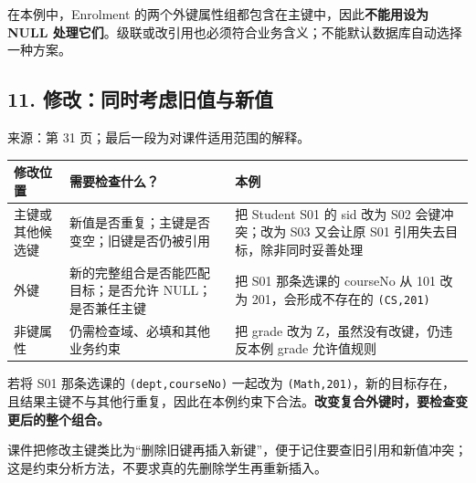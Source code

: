 在本例中，Enrolment 的两个外键属性组都包含在主键中，因此\textbf{不能用设为 NULL 处理它们}。级联或改引用也必须符合业务含义；不能默认数据库自动选择一种方案。

\subsection{11. 修改：同时考虑旧值与新值}\label{03_relational_model_and_integrity_zh-ux4feeux6539ux540cux65f6ux8003ux8651ux65e7ux503cux4e0eux65b0ux503c}

来源：第 31 页；最后一段为对课件适用范围的解释。

\begin{longtable}[]{@{}
  >{\raggedright\arraybackslash}p{}
  >{\raggedright\arraybackslash}p{}
  >{\raggedright\arraybackslash}p{}@{}}
\toprule\noalign{}
\begin{minipage}[b]{\linewidth}\raggedright
修改位置
\end{minipage} & \begin{minipage}[b]{\linewidth}\raggedright
需要检查什么？
\end{minipage} & \begin{minipage}[b]{\linewidth}\raggedright
本例
\end{minipage} \\
\midrule\noalign{}
\endhead
\bottomrule\noalign{}
\endlastfoot
主键或其他候选键 & 新值是否重复；主键是否变空；旧键是否仍被引用 & 把 Student S01 的 sid 改为 S02 会键冲突；改为 S03 又会让原 S01 引用失去目标，除非同时妥善处理 \\
外键 & 新的完整组合是否能匹配目标；是否允许 NULL；是否兼任主键 & 把 S01 那条选课的 courseNo 从 101 改为 201，会形成不存在的 \texttt{(\allowbreak{}CS,\allowbreak{}201)\allowbreak{}} \\
非键属性 & 仍需检查域、必填和其他业务约束 & 把 grade 改为 Z，虽然没有改键，仍违反本例 grade 允许值规则 \\
\end{longtable}

若将 S01 那条选课的 \texttt{(\allowbreak{}dept,\allowbreak{}courseNo)\allowbreak{}} 一起改为 \texttt{(\allowbreak{}Math,\allowbreak{}201)\allowbreak{}}，新的目标存在，且结果主键不与其他行重复，因此在本例约束下合法。\textbf{改变复合外键时，要检查变更后的整个组合。}

课件把修改主键类比为``删除旧键再插入新键''，便于记住要查旧引用和新值冲突；这是约束分析方法，不要求真的先删除学生再重新插入。

